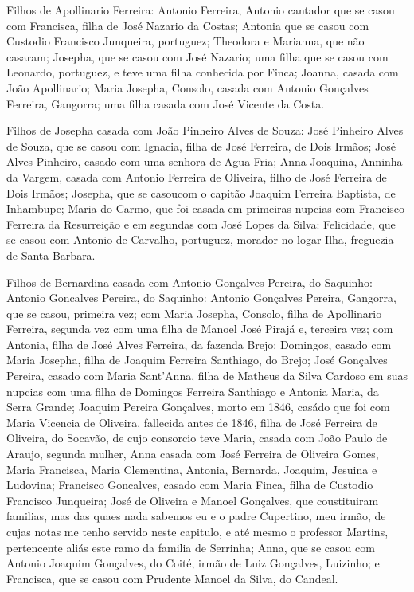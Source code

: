 Filhos de Apollinario Ferreira: Antonio Ferreira, Antonio cantador que se casou com Francisca, filha de José Nazario da Costas; Antonia que se casou com Custodio Francisco Junqueira, portuguez; Theodora e Marianna, que não casaram; Josepha, que se casou com José Nazario; uma filha que se casou com Leonardo, portuguez, e teve uma filha conhecida por Finca; Joanna, casada com João Apollinario; Maria Josepha, Consolo, casada com Antonio Gonçalves Ferreira, Gangorra; uma filha casada com José Vicente da Costa.

Filhos de Josepha casada com João Pinheiro Alves de Souza: José Pinheiro Alves de Souza, que se casou com Ignacia, filha de José
Ferreira, de Dois Irmãos; José Alves Pinheiro, casado com uma senhora de Agua Fria; Anna Joaquina, Anninha da Vargem, casada com Antonio Ferreira de Oliveira, filho de José Ferreira de Dois Irmãos; Josepha, que se casoucom o capitão Joaquim Ferreira Baptista, de Inhambupe; Maria do Carmo, que foi casada em primeiras nupcias com Francisco Ferreira da Resurreição e em segundas com José Lopes da Silva: Felicidade, que se casou com Antonio de Carvalho, portuguez, morador no logar Ilha, freguezia de Santa Barbara.

Filhos de Bernardina casada com Antonio Gonçalves Pereira, do Saquinho: Antonio Goncalves Pereira, do Saquinho: Antonio Gonçalves Pereira, Gangorra, que se casou, primeira vez; com Maria Josepha, Consolo, filha de Apollinario Ferreira, segunda vez com uma filha de Manoel José Pirajá e, terceira vez; com Antonia, filha de José Alves Ferreira, da fazenda Brejo; Domingos, casado com Maria Josepha, filha de Joaquim Ferreira Santhiago, do Brejo; José Gonçalves Pereira, casado com Maria Sant'Anna, filha de Matheus da Silva Cardoso em suas nupcias com uma filha de Domingos Ferreira Santhiago e Antonia Maria, da Serra Grande; Joaquim Pereira Gonçalves, morto em 1846, casádo que foi com Maria Vicencia de Oliveira, fallecida antes de 1846, filha de José Ferreira de Oliveira, do Socavão, de cujo consorcio teve Maria, casada com João Paulo de Araujo, segunda mulher, Anna casada com José Ferreira de Oliveira Gomes, Maria Francisca, Maria Clementina, Antonia, Bernarda, Joaquim, Jesuina e Ludovina; Francisco Goncalves, casado com Maria Finca, filha de Custodio Francisco Junqueira; José de Oliveira e  Manoel Gonçalves, que coustituiram familias, mas das quaes nada sabemos eu e o padre Cupertino, meu irmão, de cujas notas me tenho servido neste capitulo, e até mesmo o professor Martins, pertencente aliás este ramo da familia de Serrinha; Anna, que se casou com Antonio Joaquim Gonçalves, do Coité, irmão de Luiz Gonçalves, Luizinho; e Francisca, que se casou com Prudente Manoel da Silva, do Candeal. 

